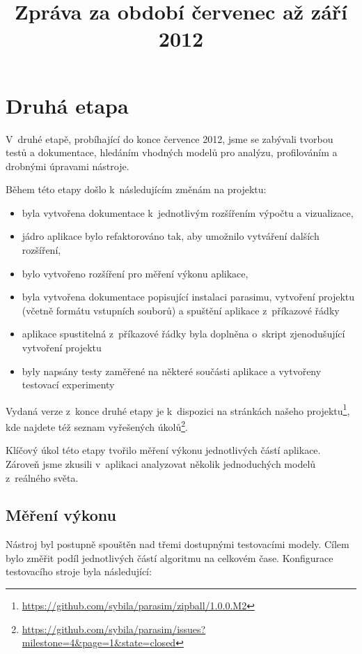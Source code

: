 \documentclass{parasim}
\title{Zpráva za období červenec až září 2012}
\begin{document}
\section{Druhá etapa}
V~druhé etapě, probíhající do konce července 2012, jsme se zabývali tvorbou testů a dokumentace,
hledáním vhodných modelů pro analýzu, profilováním a drobnými úpravami nástroje.

Během této etapy došlo k~následujícím změnám na projektu:
\begin{itemize}
	\item	byla vytvořena dokumentace k~jednotlivým rozšířením výpočtu a vizualizace,
	\item	jádro aplikace bylo refaktorováno tak, aby umožnilo vytváření dalších rozšíření,
	\item	bylo vytvořeno rozšíření pro měření výkonu aplikace,
	\item	byla vytvořena dokumentace popisující instalaci parasimu, vytvoření projektu (včetně formátu vstupních souborů) a spuštění aplikace z~příkazové řádky
	\item	aplikace spustitelná z~příkazové řádky byla doplněna o~skript zjenodušující vytvoření projektu
	\item	byly napsány testy zaměřené na některé součásti aplikace a vytvořeny testovací experimenty
\end{itemize}

Vydaná verze z~konce druhé etapy je k~dispozici na stránkách našeho projektu\footnote{\url{https://github.com/sybila/parasim/zipball/1.0.0.M2}},
kde najdete též seznam vyřešených úkolů\footnote{\url{https://github.com/sybila/parasim/issues?milestone=4&page=1&state=closed}}.

Klíčový úkol této etapy tvořilo měření výkonu jednotlivých částí aplikace. Zároveň jsme zkusili v~aplikaci analyzovat několik jednoduchých modelů z~reálného světa.

\subsection{Měření výkonu}\label{sec:performance}
Nástroj byl postupně spouštěn nad třemi dostupnými testovacími modely. Cílem bylo změřit podíl jednotlivých částí algoritmu na celkovém čase.
Konfigurace testovacího stroje byla následující:
\begin{center}
\end{center}
\end{document}

